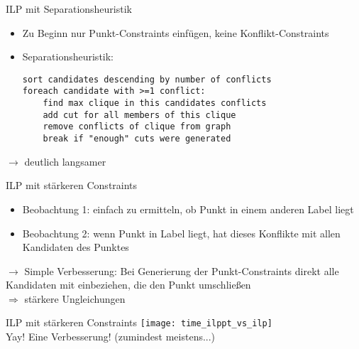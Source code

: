 \documentclass[ngerman,aspectratio=169,10pt]{beamer}
\begin{document}
\begin{frame}[fragile]{ILP mit Separationsheuristik}
    \begin{itemize}
        \item Zu Beginn nur Punkt-Constraints einfügen, keine Konflikt-Constraints
        \item Separationsheuristik:
        \begin{verbatim}
sort candidates descending by number of conflicts
foreach candidate with >=1 conflict:
    find max clique in this candidates conflicts
    add cut for all members of this clique
    remove conflicts of clique from graph
    break if "enough" cuts were generated
        \end{verbatim}
    \end{itemize}
    \pause
    $\longrightarrow$ deutlich langsamer
\end{frame}

\begin{frame}{ILP mit stärkeren Constraints}
    \begin{itemize}
        \item Beobachtung 1: einfach zu ermitteln, ob Punkt in einem anderen Label liegt
        \item Beobachtung 2: wenn Punkt in Label liegt, hat dieses Konflikte mit allen Kandidaten des Punktes
    \end{itemize}
    \pause
    $\longrightarrow$ Simple Verbesserung: Bei Generierung der Punkt-Constraints direkt alle Kandidaten mit einbeziehen, die den Punkt umschließen\\
    $\Longrightarrow$ stärkere Ungleichungen
\end{frame}

\begin{frame}{ILP mit stärkeren Constraints}
    \centering
    \texttt{[image: time\_ilppt\_vs\_ilp]}\\
    Yay! Eine Verbesserung! (zumindest meistens...)
\end{frame}
\end{document}
